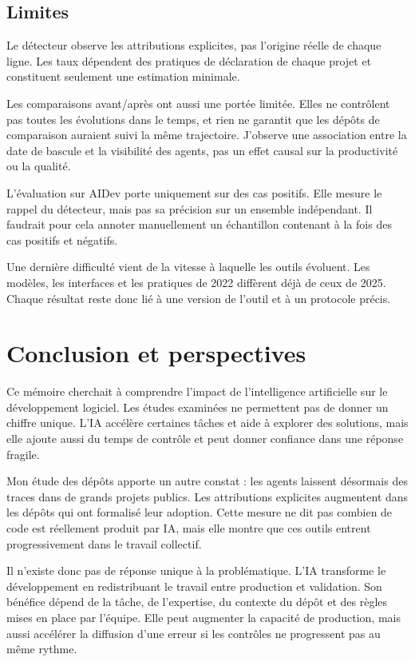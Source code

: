 \documentclass[12pt,a4paper,oneside]{report}
\begin{document}
\section{Limites}

Le détecteur observe les attributions explicites, pas l'origine réelle de chaque ligne. Les taux dépendent des pratiques de déclaration de chaque projet et constituent seulement une estimation minimale.

Les comparaisons avant/après ont aussi une portée limitée. Elles ne contrôlent pas toutes les évolutions dans le temps, et rien ne garantit que les dépôts de comparaison auraient suivi la même trajectoire. J'observe une association entre la date de bascule et la visibilité des agents, pas un effet causal sur la productivité ou la qualité.

L'évaluation sur AIDev porte uniquement sur des cas positifs. Elle mesure le rappel du détecteur, mais pas sa précision sur un ensemble indépendant. Il faudrait pour cela annoter manuellement un échantillon contenant à la fois des cas positifs et négatifs.

Une dernière difficulté vient de la vitesse à laquelle les outils évoluent. Les modèles, les interfaces et les pratiques de 2022 diffèrent déjà de ceux de 2025. Chaque résultat reste donc lié à une version de l'outil et à un protocole précis.

\chapter{Conclusion et perspectives}

Ce mémoire cherchait à comprendre l'impact de l'intelligence artificielle sur le développement logiciel. Les études examinées ne permettent pas de donner un chiffre unique. L'IA accélère certaines tâches et aide à explorer des solutions, mais elle ajoute aussi du temps de contrôle et peut donner confiance dans une réponse fragile.

Mon étude des dépôts apporte un autre constat : les agents laissent désormais des traces dans de grands projets publics. Les attributions explicites augmentent dans les dépôts qui ont formalisé leur adoption. Cette mesure ne dit pas combien de code est réellement produit par IA, mais elle montre que ces outils entrent progressivement dans le travail collectif.

Il n'existe donc pas de réponse unique à la problématique. L'IA transforme le développement en redistribuant le travail entre production et validation. Son bénéfice dépend de la tâche, de l'expertise, du contexte du dépôt et des règles mises en place par l'équipe. Elle peut augmenter la capacité de production, mais aussi accélérer la diffusion d'une erreur si les contrôles ne progressent pas au même rythme.
\end{document}
